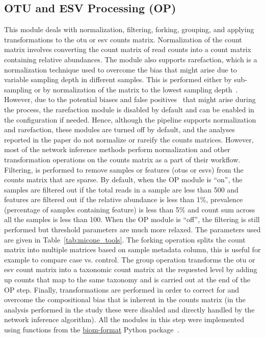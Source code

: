   \subsection*{OTU and ESV Processing (OP)}
  \vspace{-5mm}
  This module deals with normalization, filtering, forking, grouping, and applying transformations to the \ac{otu} or \ac{esv} counts matrix.
  Normalization of the count matrix involves converting the count matrix of read counts into a count matrix containing relative abundances.
  The module also supports rarefaction, which is a normalization technique used to overcome the bias that might arise due to variable sampling depth in different samples.
  This is performed either by sub-sampling or by normalization of the matrix to the lowest sampling depth~\cite{Weiss2015}.
  However, due to the potential biases and false positives~\cite{mcmurdieWasteNotWant2014,chaoCoveragebasedRarefactionExtrapolation2012} that might arise during the process, the rarefaction module is disabled by default and can be enabled in the configuration if needed.
  Hence, although the pipeline supports normalization and rarefaction, these modules are turned off by default, and the analyses reported in the paper do not normalize or rareify the counts matrices.
  However, most of the network inference methods perform normalization and other transformation operations on the counts matrix as a part of their workflow.
  Filtering, is performed to remove samples or features (\ac{otu}s or \ac{esv}s) from the counts matrix that are sparse.
  By default, when the OP module is ``on'', the samples are filtered out if the total reads in a sample are less than 500 and features are filtered out if the relative abundance is less than 1\%, prevalence (percentage of samples containing feature) is less than 5\% and count sum across all the samples is less than 100.
  When the OP module is ``off'', the filtering is still performed but threshold parameters are much more relaxed.
  The parameters used are given in Table~\ref{tab:micone_tools}.
  The forking operation splits the count matrix into multiple matrices based on sample metadata column, this is useful for example to compare case vs. control.
  The group operation transforms the \ac{otu} or \ac{esv} count matrix into a taxonomic count matrix at the requested level by adding up counts that map to the same taxonomy and is carried out at the end of the OP step.
  Finally, transformations are performed in order to correct for and overcome the compositional bias that is inherent in the counts matrix (in the analysis performed in the study these were disabled and directly handled by the network inference algorithm).
  All the modules in this step were implemented using functions from the \href{http://biom-format.org/}{biom-format} Python package~\cite{mcdonaldBiologicalObservationMatrix2012}.

